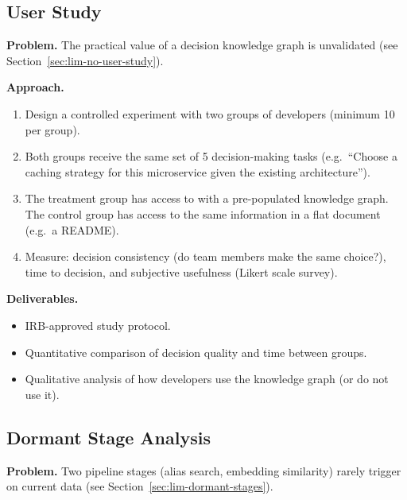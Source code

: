 \subsection{User Study}
\label{sec:future-user-study}

\noindent\textbf{Problem.}
The practical value of a decision knowledge graph is unvalidated (see
Section~\ref{sec:lim-no-user-study}).

\medskip\noindent\textbf{Approach.}

\begin{enumerate}
    \item Design a controlled experiment with two groups of developers
          (minimum 10 per group).
    \item Both groups receive the same set of 5 decision-making tasks
          (e.g.\ ``Choose a caching strategy for this microservice given
          the existing architecture'').
    \item The treatment group has access to \sysname{} with a
          pre-populated knowledge graph.  The control group has access to
          the same information in a flat document (e.g.\ a README).
    \item Measure: decision consistency (do team members make the same
          choice?), time to decision, and subjective usefulness (Likert
          scale survey).
\end{enumerate}

\medskip\noindent\textbf{Deliverables.}

\begin{itemize}
    \item IRB-approved study protocol.
    \item Quantitative comparison of decision quality and time between
          groups.
    \item Qualitative analysis of how developers use the knowledge graph
          (or do not use it).
\end{itemize}


\subsection{Dormant Stage Analysis}
\label{sec:future-dormant}

\noindent\textbf{Problem.}
Two pipeline stages (alias search, embedding similarity) rarely trigger
on current data (see Section~\ref{sec:lim-dormant-stages}).

